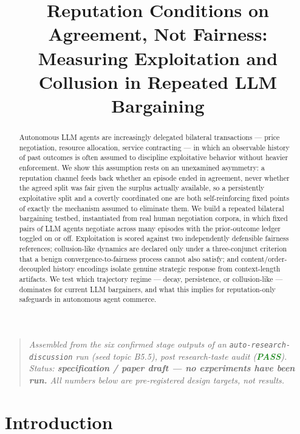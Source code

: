 \documentclass[11pt]{article}
\title{\textbf{Reputation Conditions on Agreement, Not Fairness:\\ Measuring Exploitation and Collusion in Repeated LLM Bargaining}}
\author{}
\date{}
\begin{document}
\maketitle
\vspace{-2em}

\begin{quote}
\small\textit{Assembled from the six confirmed stage outputs of an \texttt{auto-research-discussion} run (seed topic B5.5), post research-taste audit (\textcolor{ForestGreen}{\textbf{PASS}}). Status: \textbf{specification / paper draft --- no experiments have been run.} All numbers below are pre-registered design targets, not results.}
\end{quote}

\begin{abstract}
Autonomous LLM agents are increasingly delegated bilateral transactions --- price negotiation, resource allocation, service contracting --- in which an observable history of past outcomes is often assumed to discipline exploitative behavior without heavier enforcement. We show this assumption rests on an unexamined asymmetry: a reputation channel feeds back whether an episode ended in agreement, never whether the agreed split was fair given the surplus actually available, so a persistently exploitative split and a covertly coordinated one are both self-reinforcing fixed points of exactly the mechanism assumed to eliminate them. We build a repeated bilateral bargaining testbed, instantiated from real human negotiation corpora, in which fixed pairs of LLM agents negotiate across many episodes with the prior-outcome ledger toggled on or off. Exploitation is scored against two independently defensible fairness references; collusion-like dynamics are declared only under a three-conjunct criterion that a benign convergence-to-fairness process cannot also satisfy; and content/order-decoupled history encodings isolate genuine strategic response from context-length artifacts. We test which trajectory regime --- decay, persistence, or collusion-like --- dominates for current LLM bargainers, and what this implies for reputation-only safeguards in autonomous agent commerce.
\end{abstract}

\section{Introduction}
\end{document}
